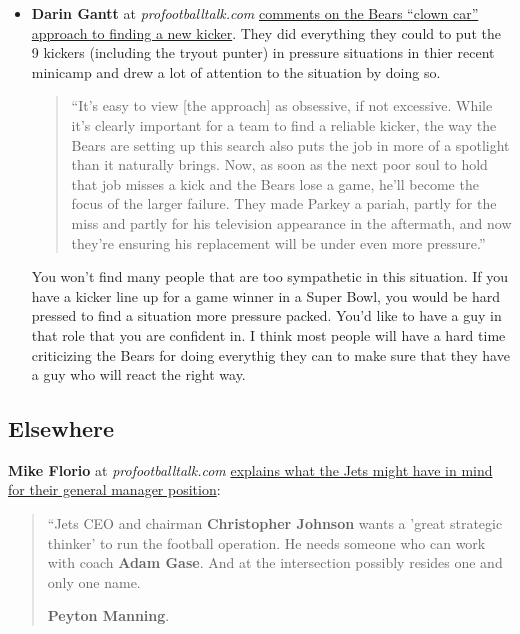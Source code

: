 \documentclass[11pt]{article}
\begin{document}
\begin{itemize}
\item \textbf{Darin Gantt} at \emph{profootballtalk.com} \href{https://profootballtalk.nbcsports.com/2019/05/17/bears-had-tryout-punter-kicking-field-goals-during-minicamp/}{comments on the Bears ``clown car'' approach to finding a new kicker}.  They did everything they could to put the 9 kickers (including the tryout punter) in pressure situations in thier recent minicamp and drew a lot of attention to the situation by doing so.

\begin{quote}
``It’s easy to view [the approach] as obsessive, if not excessive. While it’s clearly important for a team to find a reliable kicker, the way the Bears are setting up this search also puts the job in more of a spotlight than it naturally brings. Now, as soon as the next poor soul to hold that job misses a kick and the Bears lose a game, he’ll become the focus of the larger failure. They made Parkey a pariah, partly for the miss and partly for his television appearance in the aftermath, and now they’re ensuring his replacement will be under even more pressure.''
\end{quote}

You won't find many people that are too sympathetic in this situation.  If you have a kicker line up for a game winner in a Super Bowl, you would be hard pressed to find a situation more pressure packed.  You'd like to have a guy in that role that you are confident in.  I think most people will have a hard time criticizing the Bears for doing everythig they can to make sure that they have a guy who will react the right way.
\end{itemize}

\subsection{Elsewhere}

\item \textbf{Mike Florio} at \emph{profootballtalk.com} \href{https://profootballtalk.nbcsports.com/2019/05/17/rumors-fly-of-the-jets-pursuing-peyton-manning/}{explains what the Jets might have in mind for their general manager position}:

\begin{quote}
``Jets CEO and chairman \textbf{Christopher Johnson} wants a 'great strategic thinker' to run the football operation. He needs someone who can work with coach \textbf{Adam Gase}. And at the intersection possibly resides one and only one name.

\textbf{Peyton Manning}.
\end{quote}
\end{document}
